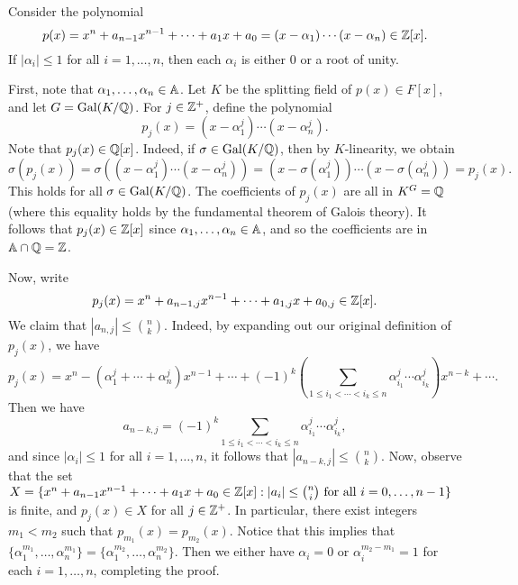 \begin{theo}[Kronecker]{}
    Consider the polynomial 
    \[ p(x) = x^n + a_{n-1} x^{n-1} + \cdots + a_1 x + a_0 = 
    (x - \alpha_1) \cdots (x - \alpha_n) \in \mathbb{Z}[x]. \] 
    If $|\alpha_i| \leq 1$ for all $i = 1, \dots, n$, then each $\alpha_i$ is 
    either $0$ or a root of unity. 
\end{theo}
\begin{pf}
    First, note that $\alpha_1, \dots, \alpha_n \in \mathbb{A}$. Let $K$ be the splitting 
    field of $p(x) \in F[x]$, and let $G = \operatorname{Gal}(K/\mathbb{Q})$. For $j \in \mathbb{Z}^+$, define 
    the polynomial 
    \[ p_j(x) = (x - \alpha_1^j) \cdots (x - \alpha_n^j). \] 
    Note that $p_j(x) \in \mathbb{Q}[x]$. Indeed, if $\sigma \in \operatorname{Gal}(K/\mathbb{Q})$, then 
    by $K$-linearity, we obtain 
    \[ \sigma(p_j(x)) = \sigma((x - \alpha_1^j) \cdots (x - \alpha_n^j)) 
    = (x - \sigma(\alpha_1^j)) \cdots (x - \sigma(\alpha_n^j)) = p_j(x). \] 
    This holds for all $\sigma \in \operatorname{Gal}(K/\mathbb{Q})$. The coefficients of $p_j(x)$ 
    are all in $K^G = \mathbb{Q}$ (where this equality holds by the fundamental 
    theorem of Galois theory). It follows that $p_j(x) \in \mathbb{Z}[x]$ since 
    $\alpha_1, \dots, \alpha_n \in \mathbb{A}$, and so the coefficients are in 
    $\mathbb{A} \cap \mathbb{Q} = \mathbb{Z}$. 

    Now, write 
    \[ p_j(x) = x^n + a_{n-1,j} x^{n-1} + \cdots + a_{1,j} x + a_{0,j} \in \mathbb{Z}[x]. \] 
    We claim that $|a_{n,j}| \leq \binom{n}{k}$. Indeed, by expanding out 
    our original definition of $p_j(x)$, we have 
    \[ p_j(x) = x^n - (\alpha_1^j + \cdots + \alpha_n^j) x^{n-1} + \cdots 
    + (-1)^k \left( \sum_{1\leq i_1 < \cdots < i_k \leq n} \alpha_{i_1}^j \cdots 
    \alpha_{i_k}^j \right) x^{n-k} + \cdots. \]
    Then we have 
    \[ a_{n-k,j} = (-1)^k \sum_{1\leq i_1 < \cdots < i_k \leq n} \alpha_{i_1}^j \cdots 
    \alpha_{i_k}^j, \] 
    and since $|\alpha_i| \leq 1$ for all $i = 1, \dots, n$, it follows that 
    $|a_{n-k,j}| \leq \binom{n}{k}$. Now, observe that the set 
    $X = \{x^n + a_{n-1}x^{n-1} + \cdots + a_1x + a_0 \in \mathbb{Z}[x] : 
    |a_i| \leq \binom{n}{i} \text{ for all } i = 0, \dots, n-1\}$ is finite, 
    and $p_j(x) \in X$ for all $j \in \mathbb{Z}^+$. In particular, there exist 
    integers $m_1 < m_2$ such that $p_{m_1}(x) = p_{m_2}(x)$. Notice that 
    this implies that $\{\alpha_1^{m_1}, \dots, \alpha_n^{m_1}\} 
    = \{\alpha_1^{m_2}, \dots, \alpha_n^{m_2}\}$. Then we 
    either have $\alpha_i = 0$ or $\alpha_i^{m_2-m_1} = 1$ for each 
    $i = 1, \dots, n$, completing the proof. 
\end{pf}

